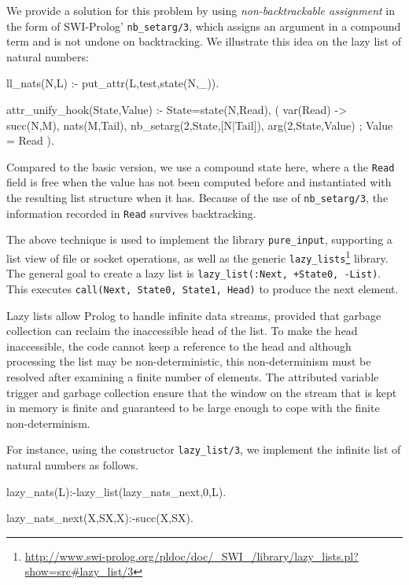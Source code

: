 \documentclass{new_tlp}
\begin{document}
We provide a solution for this problem by using \emph{non-backtrackable
assignment} in the form of SWI-Prolog' \texttt{nb\_setarg/3}, which assigns an
argument in a compound term and is not undone on backtracking. We illustrate this
idea on the lazy list of natural numbers:
\begin{code}
ll_nats(N,L) :- put_attr(L,test,state(N,_)).

attr_unify_hook(State,Value) :-
  State=state(N,Read),
  ( var(Read) ->
      succ(N,M),
      nats(M,Tail),
      nb_setarg(2,State,[N|Tail]),
      arg(2,State,Value)
  ;
      Value = Read
  ).
\end{code}
Compared to the basic version, we use a compound state here, where a
the \texttt{Read} field is free when the value has not been computed before
and instantiated with the resulting list structure when it has. Because
of the use of {\tt nb\_setarg/3}, the information recorded in \texttt{Read}
survives backtracking.

The above technique is used to implement the library \texttt{pure\_input}, supporting a list view of file or socket operations, 
as well as the generic
\texttt{lazy\_lists}\footnote{\url{http://www.swi-prolog.org/pldoc/doc/_SWI_/library/lazy_lists.pl?show=src\#lazy_list/3}}
library. The general goal to create a lazy list is
\texttt{lazy\_list(:Next, +State0, -List)}. This executes
\texttt{call(Next, State0, State1, Head)} to produce the next element.

Lazy lists allow Prolog to handle infinite data streams,  provided that garbage
collection can reclaim the inaccessible head of the list. To make the
head inaccessible, the code cannot keep a reference to the head
and although processing the list may be non-deterministic,
this non-determinism must be resolved after examining a finite number of
elements.  The attributed variable trigger and garbage collection ensure
that the window on the stream that is kept in memory is finite and
guaranteed to be large enough to cope with the finite non-determinism.


For instance, 
using the constructor  {\tt lazy\_list/3}, we implement the infinite list of
natural numbers as follows.
\begin{code}
lazy_nats(L):-lazy_list(lazy_nats_next,0,L).

lazy_nats_next(X,SX,X):-succ(X,SX).
\end{code}
\end{document}

